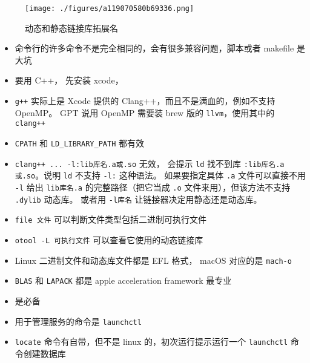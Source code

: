 
\begin{issues}
\issueDraft
\end{issues}

\begin{figure}[ht]
\centering
\texttt{[image: ./figures/a119070580b69336.png]}
\caption{动态和静态链接库拓展名} \label{fig_MacDev_1}
\end{figure}

\begin{itemize}
\item 命令行的许多命令不是完全相同的，会有很多兼容问题，脚本或者 makefile 是大坑
\item 要用 C++， 先安装 xcode， \item \verb`g++` 实际上是 Xcode 提供的 Clang++，而且不是满血的，例如不支持 OpenMP。 GPT 说用 OpenMP 需要装 brew 版的 \verb`llvm`，使用其中的 \verb`clang++`
\item \verb`CPATH` 和 \verb`LD_LIBRARY_PATH` 都有效
\item \verb`clang++ ... -l:lib库名.a或.so` 无效， 会提示 \verb`ld` 找不到库 \verb`:lib库名.a或.so`。说明 \verb`ld` 不支持 \verb`-l:` 这种语法。 如果要指定具体 \verb`.a` 文件可以直接不用 \verb`-l` 给出 \verb`lib库名.a` 的完整路径（把它当成 \verb`.o` 文件来用），但该方法不支持 \verb`.dylib` 动态库。 或者用 \verb`-l库名` 让链接器决定用静态还是动态库。
\item \verb`file 文件` 可以判断文件类型包括二进制可执行文件
\item \verb`otool -L 可执行文件` 可以查看它使用的动态链接库
\item Linux 二进制文件和动态库文件都是 EFL 格式， macOS 对应的是 \verb`mach-o`
\item \verb`BLAS` 和 \verb`LAPACK` 都是 apple acceleration framework 最专业
\item {} 是必备
\item 用于管理服务的命令是 \verb`launchctl`
\item \verb`locate` 命令有自带，但不是 linux 的，初次运行提示运行一个 \verb`launchctl` 命令创建数据库
\end{itemize}
